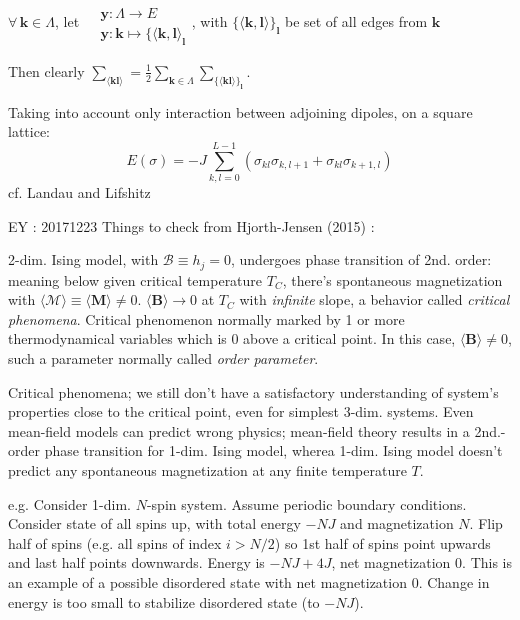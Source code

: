 \documentclass[10pt]{amsart}
\begin{document}
\begin{multicols*}{2}
$\forall \, \mathbf{k} \in \Lambda$, let $\begin{aligned} & \quad \\
	& \mathbf{y} : \Lambda \to E \\ 
		& \mathbf{y}: \mathbf{k} \mapsto \lbrace \langle \mathbf{k}, \mathbf{l} \rangle_{\mathbf{l}} \end{aligned}$, with $\lbrace \langle \mathbf{k}, \mathbf{l} \rangle \rbrace_{\mathbf{l}}$ be set of all edges from $\mathbf{k}$
		
		Then clearly $\sum_{\langle \mathbf{k} \mathbf{l} \rangle } = \frac{1}{2} \sum_{\mathbf{k} \in \Lambda} \sum_{ \lbrace \langle \mathbf{k} \mathbf{l} \rangle \rbrace_{\mathbf{l}}}$.  
		
		
Taking into account only interaction between adjoining dipoles, on a square lattice: 
\[
E(\sigma) = -J \sum_{k,l=0}^{L-1} ( \sigma_{kl}\sigma_{k,l+1} + \sigma_{kl} \sigma_{k+1, l} )
\]
cf. Landau and Lifshitz \cite{LaLi1980}


EY : 20171223 Things to check from Hjorth-Jensen (2015) \cite{Hjor2015}:  

2-dim. Ising model, with $\mathcal{B} \equiv h_j =0$, undergoes phase transition of 2nd. order: meaning below given critical temperature $T_C$, there's spontaneous magnetization with $\langle \mathcal{M} \rangle \equiv \langle \mathbf{M} \rangle \neq 0$.  $\langle \mathbf{B} \rangle \to 0$ at $T_C$ with \emph{infinite} slope, a behavior called \emph{critical phenomena}.  Critical phenomenon normally marked by 1 or more thermodynamical variables which is 0 above a critical point.  In this case, $\langle \mathbf{B} \rangle \neq 0$, such a parameter normally called \emph{order parameter}.  

Critical phenomena; we still don't have a satisfactory understanding of system's properties close to the critical point, even for simplest 3-dim. systems.  Even mean-field models can predict wrong physics; mean-field theory results in a 2nd.-order phase transition for 1-dim. Ising model, wherea 1-dim. Ising model doesn't predict any spontaneous magnetization at any finite temperature $T$.  

e.g. Consider 1-dim. $N$-spin system.  Assume periodic boundary conditions.  Consider state of all spins up, with total energy $-NJ$ and magnetization $N$.  Flip half of spins (e.g. all spins of index $i>N/2$) so 1st half of spins point upwards and last half points downwards.  Energy is $-NJ + 4J$, net magnetization $0$.  This is an example of a possible disordered state with net magnetization $0$.  Change in energy is too small to stabilize disordered state (to $-NJ$).  


\end{multicols*}
\end{document}
